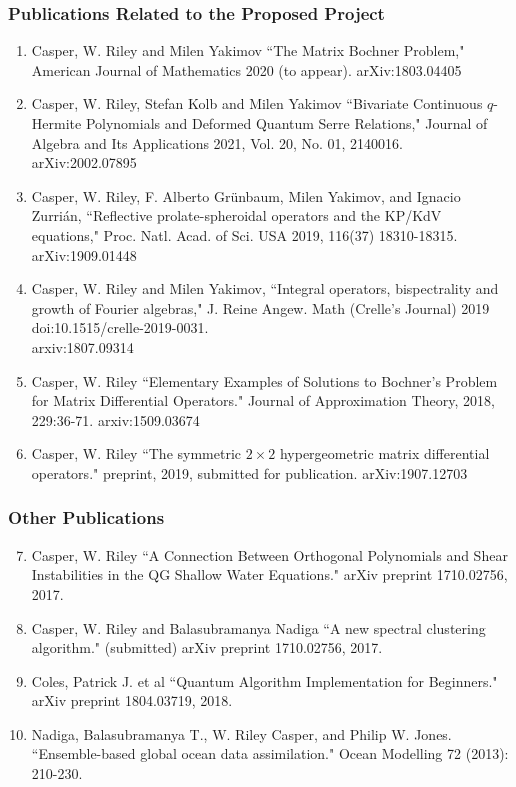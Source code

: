 \documentclass[12pt,letterpaper]{article}
\theoremstyle{definition}
\begin{document}
\subsubsection*{Publications Related to the Proposed Project}
\begin{enumerate}
\item  Casper, W. Riley and Milen Yakimov ``The Matrix Bochner Problem," American Journal of Mathematics 2020 (to appear).  arXiv:1803.04405
\item  Casper, W. Riley, Stefan Kolb and Milen Yakimov ``Bivariate Continuous $q$-Hermite Polynomials and Deformed Quantum Serre Relations," Journal of Algebra and Its Applications 2021, Vol. 20, No. 01, 2140016.  arXiv:2002.07895
\item  Casper, W. Riley, F. Alberto Gr\"unbaum, Milen Yakimov, and Ignacio Zurri\'an, ``Reflective prolate-spheroidal operators and the KP/KdV equations," Proc. Natl. Acad. of Sci. USA 2019, 116(37) 18310-18315. arXiv:1909.01448
\item  Casper, W. Riley and Milen Yakimov, ``Integral operators, bispectrality and growth of Fourier algebras," J. Reine Angew. Math (Crelle's Journal) 2019 doi:10.1515/crelle-2019-0031.\\arxiv:1807.09314
\item  Casper, W. Riley ``Elementary Examples of Solutions to Bochner's Problem for Matrix Differential Operators." Journal of Approximation Theory, 2018, 229:36-71.  arxiv:1509.03674
\item  Casper, W. Riley ``The symmetric $2\times 2$ hypergeometric matrix differential operators." preprint, 2019, submitted for publication.  arXiv:1907.12703
\end{enumerate}
\subsubsection*{Other Publications}
\begin{enumerate}
\setcounter{enumi}{6}
\item  Casper, W. Riley ``A Connection Between Orthogonal Polynomials and Shear Instabilities in the QG Shallow Water Equations." arXiv preprint 1710.02756, 2017.
\item  Casper, W. Riley and Balasubramanya Nadiga ``A new spectral clustering algorithm." (submitted) arXiv preprint 1710.02756, 2017.
\item  Coles, Patrick J. et al ``Quantum Algorithm Implementation for Beginners." arXiv preprint 1804.03719, 2018.
\item  Nadiga, Balasubramanya T., W. Riley Casper, and Philip W. Jones. ``Ensemble-based global ocean data assimilation." Ocean Modelling 72 (2013): 210-230.
\end{enumerate}
\end{document}
